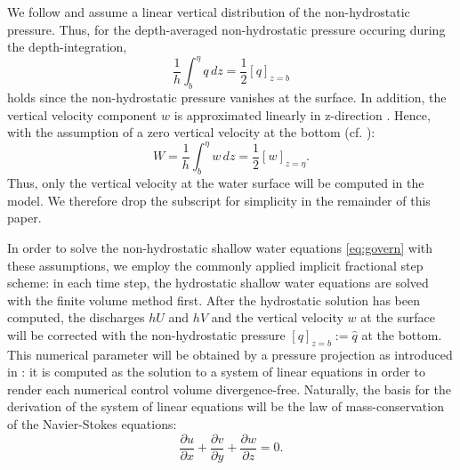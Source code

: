 We follow \cite{walters} and assume a linear vertical distribution of the non-hydrostatic pressure. Thus, for the depth-averaged non-hydrostatic pressure occuring during the depth-integration,
\begin{equation}
\frac{1}{h} \int_{b}^{\eta} q \, dz= \frac{1}{2} [q]_{z=b}
\end{equation}
holds since the non-hydrostatic pressure vanishes at the surface. In addition, the vertical velocity component $w$ is approximated linearly in z-direction \cite{walters}. Hence, with the assumption of a zero vertical velocity at the bottom (cf. \cite{cui}):
\begin{equation}
W=  \frac{1}{h} \int_{b}^{\eta} w \, dz= \frac{1}{2} [w]_{z=\eta}.
\end{equation}
Thus, only the vertical velocity at the water surface will be computed in the model. We therefore drop the subscript for simplicity in the remainder of this paper.

In order to solve the non-hydrostatic shallow water equations \eqref{eq:govern} with these assumptions, we employ the commonly applied implicit fractional step scheme: in each time step, the hydrostatic shallow water equations are solved with the finite volume method first. After the hydrostatic solution has been computed, the discharges $hU$ and $hV$ and the vertical velocity $w$ at the surface will be corrected with the non-hydrostatic pressure $[q]_{z=b}:=\hat q$ at the bottom. This numerical parameter will be obtained by a pressure projection as introduced in \cite{chorin}: it is computed as the solution to a system of linear equations in order to render each numerical control volume divergence-free. Naturally, the basis for the derivation of the system of linear equations will be the law of mass-conservation of the Navier-Stokes equations:
\begin{equation}
\frac{\partial u}{\partial x}
+
\frac{\partial v}{\partial y}
+
\frac{\partial w}{\partial z}
=
0.
\label{eq:mass_consv}
\end{equation}

